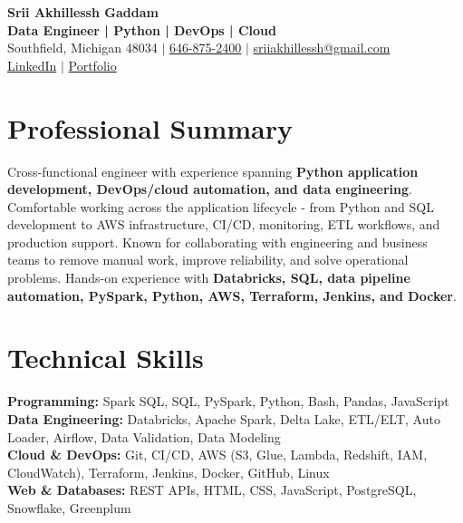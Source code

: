 \documentclass[letterpaper,10pt]{article}
\begin{document}
\fontsize{9.35pt}{10.45pt}\selectfont

\begin{center}
    {\LARGE \textbf{Srii Akhillessh Gaddam}} \\[-1pt]
    \textbf{Data Engineer | Python | DevOps | Cloud} \\[2pt]
    Southfield, Michigan 48034 $|$
    \href{tel:6468752400}{646-875-2400} $|$
    \href{mailto:sriiakhillessh@gmail.com}{sriiakhillessh@gmail.com} \\[1pt]
    \href{https://www.linkedin.com/in/srii-akhiilessh-gaddam-b48668191/}{LinkedIn} $|$
    \href{https://sriiakhillesshg.github.io/portfolio/}{Portfolio}
\end{center}
\vspace{-8pt}

\section{Professional Summary}
\small{Cross-functional engineer with experience spanning \textbf{Python application development, DevOps/cloud automation, and data engineering}. Comfortable working across the application lifecycle - from Python and SQL development to AWS infrastructure, CI/CD, monitoring, ETL workflows, and production support. Known for collaborating with engineering and business teams to remove manual work, improve reliability, and solve operational problems. Hands-on experience with \textbf{Databricks, SQL, data pipeline automation, PySpark, Python, AWS, Terraform, Jenkins, and Docker}.}

\section{Technical Skills}
\small{
\textbf{Programming:} Spark SQL, SQL, PySpark, Python, Bash, Pandas, JavaScript \\
\textbf{Data Engineering:} Databricks, Apache Spark, Delta Lake, ETL/ELT, Auto Loader, Airflow, Data Validation, Data Modeling \\
\textbf{Cloud \& DevOps:} Git, CI/CD, AWS (S3, Glue, Lambda, Redshift, IAM, CloudWatch), Terraform, Jenkins, Docker, GitHub, Linux \\
\textbf{Web \& Databases:} REST APIs, HTML, CSS, JavaScript, PostgreSQL, Snowflake, Greenplum
}

\end{document}
